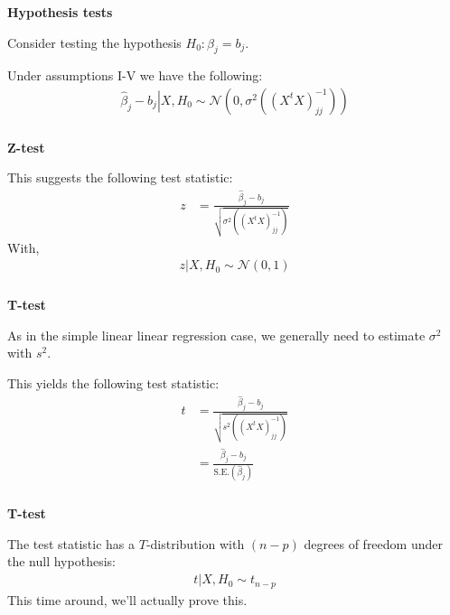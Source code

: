 \begin{frame}[fragile] \frametitle{}

{\bf Hypothesis tests}

Consider testing the hypothesis $H_0: \beta_j = b_j$.

\pause Under assumptions I-V we have the following:
\begin{align*}
\left. \widehat{\beta}_j - b_j \right| X, H_0 \sim \mathcal{N} ( 0, \sigma^2 \left( (X^t X)^{-1}_{jj} \right))
\end{align*}

\end{frame}


\begin{frame}[fragile] \frametitle{}

{\bf Z-test}

This suggests the following test statistic:
\begin{align*}
z &= \frac{\widehat{\beta}_j - b_j}{\sqrt{\sigma^2  \left( (X^t X)^{-1}_{jj} \right)}}
\end{align*}
With,
\begin{align*}
\left. z \right| X, H_0 \sim \mathcal{N} (0, 1)
\end{align*}

\end{frame}

\begin{frame}[fragile] \frametitle{}

{\bf T-test}

As in the simple linear linear regression case, we generally
need to estimate $\sigma^2$ with $s^2$.

\pause This yields the following test statistic:
\begin{align*}
t &= \frac{\widehat{\beta}_j - b_j}{\sqrt{s^2  \left( (X^t X)^{-1}_{jj} \right)}} \\
&= \frac{\widehat{\beta}_j - b_j}{\text{S.E.}(\widehat{\beta}_j)}
\end{align*}


\end{frame}

\begin{frame}[fragile] \frametitle{}

{\bf T-test}

The test statistic has a $T$-distribution with $(n-p)$ degrees
of freedom under the null hypothesis:
\begin{align*}
\left. t \right| X, H_0 \sim t_{n-p}
\end{align*}
\pause This time around, we'll actually prove this.

\end{frame}

